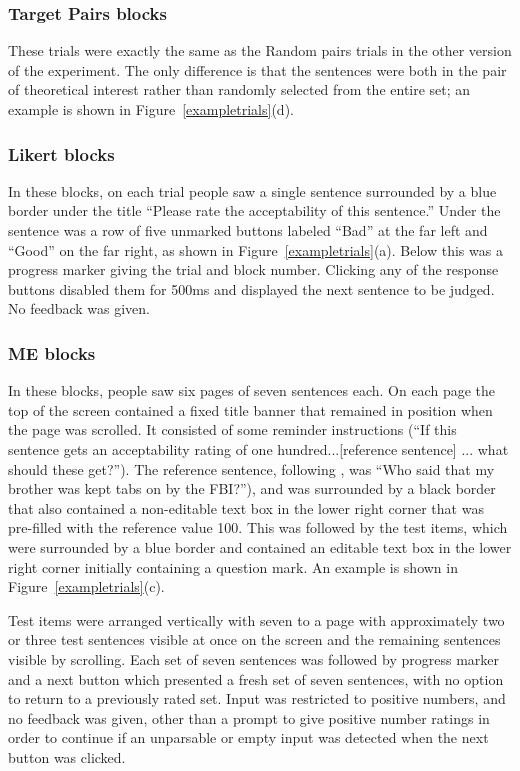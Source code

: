 \documentclass[doc]{apa6}
\newcommand{\rndchoice}{{\sc Random pairs}}
\begin{document}
\subsubsection{Target Pairs blocks}
These trials were exactly the same as the \rndchoice{} trials in the other version of the experiment. The only difference is that the sentences were both in the pair of theoretical interest rather than randomly selected from the entire set; an example is shown in Figure~\ref{exampletrials}(d).

 \subsubsection{Likert blocks} In these blocks, on each trial people saw a single sentence surrounded by a blue border under the title ``Please rate the acceptability of this sentence.'' Under the sentence was a row of five unmarked buttons labeled ``Bad'' at the far left and ``Good'' on the far right, as shown in Figure~\ref{exampletrials}(a). Below this was a progress marker giving the trial and block number. Clicking any of the response buttons disabled them for 500ms and displayed the next sentence to be judged. No feedback was given.


\subsubsection{ME blocks} In these blocks, people saw six pages of seven sentences each. On each page the top of the screen contained a fixed title banner that remained in position when the page was scrolled. It consisted of some reminder instructions (``If this sentence gets an acceptability rating of one hundred...[reference sentence] ... what should these get?''). The reference sentence, following \citet{sprouse2011turkvalidation},
was ``Who said that my brother was kept tabs on by the FBI?''), and was surrounded by a black border that also contained a non-editable text box in the lower right corner that was pre-filled with the reference value 100. This was followed by the test items, which were surrounded by a blue border and contained an editable text box in the lower right corner initially containing a question mark. An example is shown in Figure~\ref{exampletrials}(c).

Test items were arranged vertically with seven to a page with approximately two or three test sentences visible at once on the screen and the remaining sentences visible by scrolling.
 Each set of seven sentences was followed by progress marker and a next button which presented a fresh set of seven sentences, with no option to return to a previously rated set. Input was restricted to positive numbers, and no feedback was given, other than a prompt to give positive number ratings in order to continue if an unparsable or empty input was detected when the next button was clicked.
\end{document}
